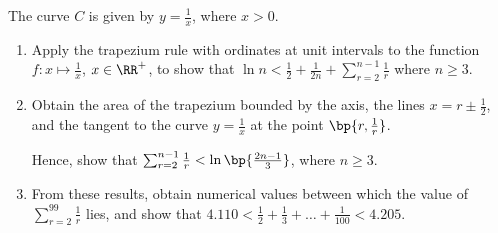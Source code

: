 \begin{problem}
    The curve $C$ is given by $y = \frac1x$, where $x > 0$.

    \begin{enumerate}
        \item Apply the trapezium rule with ordinates at unit intervals to the function $f : x \mapsto \frac1x$, $x \in \RR^+$, to show that $\ln n < \frac12 + \frac1{2n} + \sum_{r=2}^{n-1} \frac1r$ where $n \geq 3$.
        \item Obtain the area of the trapezium bounded by the axis, the lines $x = r \pm \frac12$, and the tangent to the curve $y = \frac1x$ at the point $\bp{r, \frac1r}$.

        Hence, show that $\sum_{r=2}^{n-1} \frac1r < \ln \bp{\frac{2n-1}3}$, where $n \geq 3$.
        \item From these results, obtain numerical values between which the value of $\sum_{r=2}^{99} \frac1r$ lies, and show that $4.110 < \frac12 + \frac13 + \ldots + \frac1{100} < 4.205$.
    \end{enumerate}
\end{problem}
\clearpage
